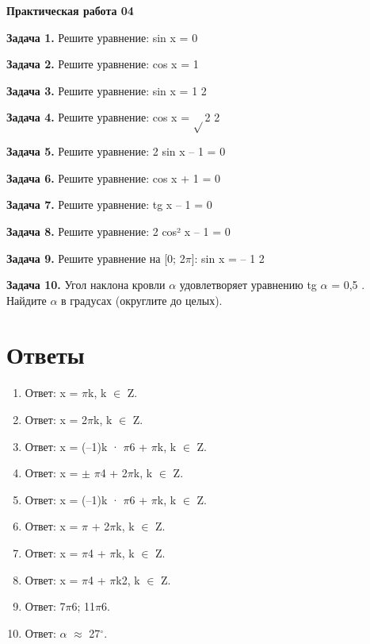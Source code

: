 \documentclass{umk-matematika}
\begin{document}
\begin{center}
{\Large\bfseries Практическая работа 04}
\end{center}
\vspace{0.5cm}

\textbf{Задача 1.} Решите уравнение: sin x = 0\par\vspace{10pt}
\textbf{Задача 2.} Решите уравнение: cos x = 1\par\vspace{10pt}
\textbf{Задача 3.} Решите уравнение: sin x = 1 2\par\vspace{10pt}
\textbf{Задача 4.} Решите уравнение: cos x = $\sqrt{}$2 2\par\vspace{10pt}
\textbf{Задача 5.} Решите уравнение: 2 sin x – 1 = 0\par\vspace{10pt}
\textbf{Задача 6.} Решите уравнение: cos x + 1 = 0\par\vspace{10pt}
\textbf{Задача 7.} Решите уравнение: tg x – 1 = 0\par\vspace{10pt}
\textbf{Задача 8.} Решите уравнение: 2 cos² x – 1 = 0\par\vspace{10pt}
\textbf{Задача 9.} Решите уравнение на [0; 2$\pi$]: sin x = – 1 2\par\vspace{10pt}
\textbf{Задача 10.} Угол наклона кровли $\alpha$ удовлетворяет уравнению tg $\alpha$ = 0,5 . Найдите $\alpha$ в градусах (округлите до целых).\par\vspace{10pt}
\newpage
\section*{Ответы}

\begin{enumerate}
  \item Ответ: x = $\pi$k, k $\in$ Z.
  \item Ответ: x = 2$\pi$k, k $\in$ Z.
  \item Ответ: x = (–1)k · $\pi$6 + $\pi$k, k $\in$ Z.
  \item Ответ: x = $\pm$ $\pi$4 + 2$\pi$k, k $\in$ Z.
  \item Ответ: x = (–1)k · $\pi$6 + $\pi$k, k $\in$ Z.
  \item Ответ: x = $\pi$ + 2$\pi$k, k $\in$ Z.
  \item Ответ: x = $\pi$4 + $\pi$k, k $\in$ Z.
  \item Ответ: x = $\pi$4 + $\pi$k2, k $\in$ Z.
  \item Ответ: 7$\pi$6; 11$\pi$6.
  \item Ответ: $\alpha$ $\approx$ 27$^\circ$.
\end{enumerate}
\end{document}
